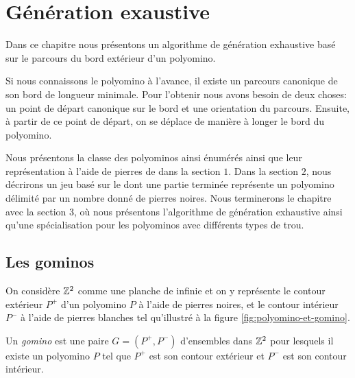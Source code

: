 \chapter{G\'en\'eration exaustive}\label{chapitre-generation}

\vspace{-1em}
Dans ce chapitre nous présentons un algorithme de génération exhaustive basé sur le parcours du bord extérieur d'un polyomino.

Si nous connaissons le polyomino à l'avance, il existe un parcours canonique de son bord de longueur minimale. Pour l'obtenir nous avons besoin de deux choses: un point de départ canonique sur le bord et une orientation du parcours. Ensuite, à partir de ce point de départ, on se déplace de manière à longer le bord du polyomino. 

Nous présentons la classe des polyominos ainsi énumérés ainsi que leur représentation à l'aide de pierres de \Go dans la section $1$. Dans la section $2$, nous décrirons un jeu basé sur le \Go dont une partie terminée représente un polyomino délimité par un nombre donné de pierres noires. Nous terminerons le chapitre avec la section $3$, où nous présentons l'algorithme de génération exhaustive ainsi qu'une spécialisation pour les polyominos avec différents types de trou.


\vspace{-1em}
\section{Les gominos}


\vspace{-0.5em}
On considère $\mathbb{Z}^2$ comme une planche de \Go infinie et on y représente le contour extérieur $P^+$ d'un polyomino $P$ à l'aide de pierres noires, et le contour intérieur $P^-$ à l'aide de pierres blanches tel qu'illustré à la figure \ref{fig:polyomino-et-gomino}. 

\begin{definition}\label{def:gomino}
Un \emph{gomino} est une paire $G=\left( P^+,P^- \right)$ d'ensembles dans $\mathbb{Z}^2$ pour lesquels il existe un polyomino $P$ tel que $P^+$ est son contour extérieur et $P^-$ est son contour intérieur.
\end{definition}

